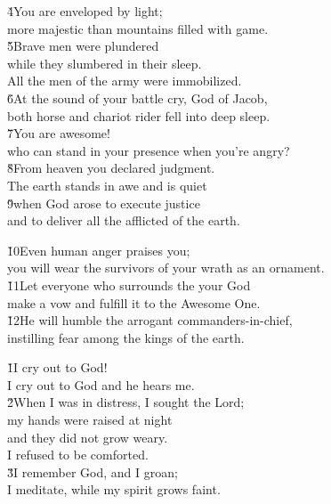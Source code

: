 \begin{poetry}
\poeml \v{4}You are enveloped by light; \\
\poemll    more majestic than mountains filled with game. \\
\poeml \v{5}Brave men were plundered \\
\poemll    while they slumbered in their sleep. \\
\poemlll       All the men of the army were immobilized. \\
\poeml \v{6}At the sound of your battle cry, God of Jacob, \\
\poemll    both horse and chariot rider fell into deep sleep. \\
\poeml \v{7}You are awesome! \\
\poemll    who can stand in your presence when you're angry? \\
\poeml \v{8}From heaven you declared judgment. \\
\poemll    The earth stands in awe and is quiet \\
\poeml \v{9}when God arose to execute justice \\
\poemll    and to deliver all the afflicted of the earth.
\end{poetry}

\begin{poetry}
\poeml \v{10}Even human anger praises you; \\
\poemll    you will wear the survivors of your wrath as an ornament. \\
\poeml \v{11}Let everyone who surrounds the  your God \\
\poemll    make a vow and fulfill it to the Awesome One. \\
\poeml \v{12}He will humble the arrogant commanders-in-chief, \\
\poemll    instilling fear among the kings of the earth.
\end{poetry}

\begin{poetry}
\poeml \v{1}I cry out to God! \\
\poemll    I cry out to God and he hears me. \\
\poeml \v{2}When I was in distress, I sought the Lord; \\
\poemll    my hands were raised at night \\
\poeml and they did not grow weary. \\
\poemlll       I refused to be comforted. \\
\poeml \v{3}I remember God, and I groan; \\
\poemll    I meditate, while my spirit grows faint.
\end{poetry}

